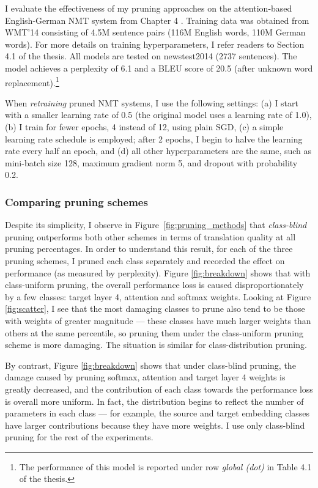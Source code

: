 I evaluate the effectiveness of my pruning approaches on the attention-based English-German NMT system 
from Chapter 4 \cite{luong15attn}. 
Training data was obtained from WMT'14 consisting
of 4.5M sentence pairs (116M English words, 110M German words). For
more details on training hyperparameters, I refer readers to Section 4.1 of
the thesis.
All models are tested on newstest2014 (2737 sentences). 
The model achieves a
perplexity of 6.1 and a BLEU score of
20.5 (after unknown word replacement).\footnote{The performance of this model
is reported under row {\it global (dot)} in Table 4.1 of the thesis.}

When {\it retraining} pruned NMT systems, I use the following settings: (a) I start
with a smaller learning rate of 0.5 (the original model uses a learning rate of
1.0), (b) I train for fewer epochs, 4 instead of 12, using plain SGD, (c) a simple learning
rate schedule is employed; after 2 epochs, I begin to halve the learning rate
every half an epoch, and (d) all other hyperparameters are the same, such as
mini-batch size 128, maximum gradient norm 5, and dropout with probability 0.2.

\subsubsection{Comparing pruning schemes}
\label{subsubsec:exp_schemes}
Despite its simplicity, I observe in Figure~\ref{fig:pruning_methods} that {\it
class-blind} pruning outperforms both other schemes in terms of translation
quality at all pruning percentages.
In order to understand this result, for each of the three pruning schemes, I pruned each class separately and recorded the effect on performance (as measured by perplexity).
Figure \ref{fig:breakdown} shows that with class-uniform pruning, the overall performance loss is caused disproportionately by a few classes: target layer 4, attention and softmax weights. Looking at Figure \ref{fig:scatter}, I see that the most damaging classes to prune also tend to be those with weights of greater magnitude --- these classes have much larger weights than others at the same percentile, so pruning them under the class-uniform pruning scheme is more damaging. The situation is similar for class-distribution pruning.



By contrast, Figure \ref{fig:breakdown} shows that under class-blind pruning, the damage caused by pruning softmax, attention and target layer 4 weights is greatly decreased, and the contribution of each class towards the performance loss is overall more uniform.
In fact, the distribution begins to reflect the number of parameters in each class --- for example, the source and target embedding classes have larger contributions because they have more weights. 
I use only class-blind pruning for the rest of the experiments.

